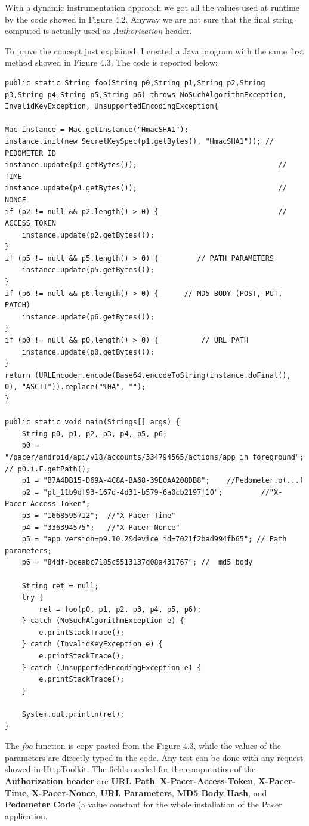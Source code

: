 			With a dynamic instrumentation approach we got all the values used at runtime by the code showed in Figure 4.2. Anyway we are not sure that the final string computed is actually used as \textit{Authorization} header. \newline
			\par To prove the concept just explained, I created a Java program with the same first method showed in Figure 4.3. The code is reported below:

\begin{lstlisting}
public static String foo(String p0,String p1,String p2,String p3,String p4,String p5,String p6) throws NoSuchAlgorithmException, InvalidKeyException, UnsupportedEncodingException{

Mac instance = Mac.getInstance("HmacSHA1");
instance.init(new SecretKeySpec(p1.getBytes(), "HmacSHA1")); // PEDOMETER ID
instance.update(p3.getBytes());                            		// TIME
instance.update(p4.getBytes());                     			// NONCE
if (p2 != null && p2.length() > 0) {           					// ACCESS_TOKEN
	instance.update(p2.getBytes());
}
if (p5 != null && p5.length() > 0) {         // PATH PARAMETERS
	instance.update(p5.getBytes());
}
if (p6 != null && p6.length() > 0) {      // MD5 BODY (POST, PUT, PATCH)
	instance.update(p6.getBytes());
}
if (p0 != null && p0.length() > 0) {          // URL PATH
	instance.update(p0.getBytes());
}
return (URLEncoder.encode(Base64.encodeToString(instance.doFinal(), 0), "ASCII")).replace("%0A", "");
}
    
public static void main(Strings[] args) {
	String p0, p1, p2, p3, p4, p5, p6;
	p0 = "/pacer/android/api/v18/accounts/334794565/actions/app_in_foreground"; // p0.i.F.getPath();
	p1 = "B7A4DB15-D69A-4C8A-BA68-39E0AA208DB8"; 	//Pedometer.o(...)  
	p2 = "pt_11b9df93-167d-4d31-b579-6a0cb2197f10"; 		//"X-Pacer-Access-Token";
	p3 = "1668595712";  //"X-Pacer-Time" 
	p4 = "336394575";   //"X-Pacer-Nonce" 
	p5 = "app_version=p9.10.2&device_id=7021f2bad994fb65"; // Path parameters;
	p6 = "84df-bceabc7185c5513137d08a431767"; //  md5 body

	String ret = null;
	try {
		ret = foo(p0, p1, p2, p3, p4, p5, p6);
	} catch (NoSuchAlgorithmException e) {
		e.printStackTrace();
	} catch (InvalidKeyException e) {
		e.printStackTrace();
	} catch (UnsupportedEncodingException e) {
		e.printStackTrace();
	}

	System.out.println(ret);
}
\end{lstlisting}
			\par The \textit{foo} function is copy-pasted from the Figure 4.3, while the values of the parameters are directly typed in the code. Any test can be done with any request showed in HttpToolkit. The fields needed for the computation of the \textbf{Authorization header} are \textbf{URL Path}, \textbf{X-Pacer-Access-Token}, \textbf{X-Pacer-Time}, \textbf{X-Pacer-Nonce}, \textbf{URL Parameters}, \textbf{MD5 Body Hash}, and \textbf{Pedometer Code} (a value constant for the whole installation of the Pacer application. 
		

